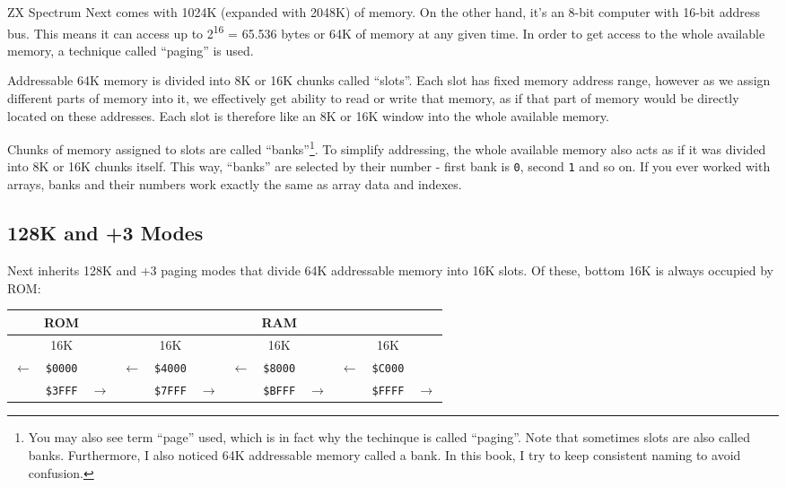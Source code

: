 \documentclass[12pt,twoside,openright,a4paper]{book}
\newcommand{\notet}{\rule{0pt}{2.4ex}}
\newcommand{\noteb}{\rule[-1.3ex]{0pt}{0pt}}
\begin{document}
\newcommand{\colnoline}[1]{\multicolumn{1}{c}{#1}}

ZX Spectrum Next comes with 1024K (expanded with 2048K) of memory. On the other hand, it's an 8-bit computer with 16-bit address bus. This means it can access up to 2\textsuperscript{16} = 65.536 bytes or 64K of memory at any given time. In order to get access to the whole available memory, a technique called ``paging'' is used. 

Addressable 64K memory is divided into 8K or 16K chunks called ``slots''. Each slot has fixed memory address range, however as we assign different parts of memory into it, we effectively get ability to read or write that memory, as if that part of memory would be directly located on these addresses. Each slot is therefore like an 8K or 16K window into the whole available memory.

Chunks of memory assigned to slots are called ``banks''\footnote{You may also see term ``page'' used, which is in fact why the techinque is called ``paging''. Note that sometimes slots are also called banks. Furthermore, I also noticed 64K addressable memory called a bank. In this book, I try to keep consistent naming to avoid confusion.}. To simplify addressing, the whole available memory also acts as if it was divided into 8K or 16K chunks itself. This way, ``banks'' are selected by their number - first bank is {\tt 0}, second {\tt 1} and so on. If you ever worked with arrays, banks and their numbers work exactly the same as array data and indexes.

\subsection{128K and +3 Modes}

Next inherits 128K and +3 paging modes that divide 64K addressable memory into 16K slots. Of these, bottom 16K is always occupied by ROM:

\begingroup
	\setlength{\tabcolsep}{1pt}
	\begin{tabular}{|ccc|ccc|ccc|ccc|}
		\hline
		\multicolumn{3}{|c}{ROM}\notet\noteb &
			\multicolumn{9}{|c|}{RAM} \\
		\hline
		\multicolumn{3}{|c}{16K}\notet\noteb &
			\multicolumn{3}{|c}{16K} &
			\multicolumn{3}{|c}{16K} &
			\multicolumn{3}{|c|}{16K} \\
		\hline
		\colnoline{$\leftarrow$}\notet & \colnoline{\tt \$0000} & \colnoline{} &
			\colnoline{$\leftarrow$} & \colnoline{\tt \$4000} & \colnoline{} &
			\colnoline{$\leftarrow$} & \colnoline{\tt \$8000} & \colnoline{} &
			\colnoline{$\leftarrow$} & \colnoline{\tt \$C000} & \colnoline{} \\
		\colnoline{} & \colnoline{\tt \$3FFF} & \colnoline{$\rightarrow$} &
			\colnoline{} & \colnoline{\tt \$7FFF} & \colnoline{$\rightarrow$} &
			\colnoline{} & \colnoline{\tt \$BFFF} & \colnoline{$\rightarrow$} &
			\colnoline{} & \colnoline{\tt \$FFFF} & \colnoline{$\rightarrow$} \\
	\end{tabular}
\endgroup
\end{document}
